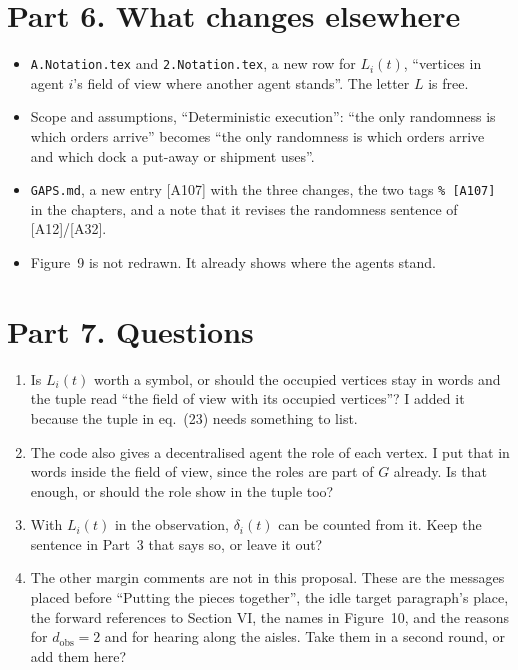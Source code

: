 \documentclass[11pt,a4paper]{article}
\newcommand{\dobs}{d_{\mathrm{obs}}}
\begin{document}
\section*{Part 6. What changes elsewhere}
\begin{itemize}[nosep]
  \item \texttt{A.Notation.tex} and \texttt{2.Notation.tex}, a new row for
        $L_i(t)$, ``vertices in agent $i$'s field of view where another agent
        stands''. The letter $L$ is free.
  \item Scope and assumptions, ``Deterministic execution'': ``the only
        randomness is which orders arrive'' becomes ``the only randomness is
        which orders arrive and which dock a put-away or shipment uses''.
  \item \texttt{GAPS.md}, a new entry [A107] with the three changes, the two
        tags \texttt{\% [A107]} in the chapters, and a note that it revises
        the randomness sentence of [A12]/[A32].
  \item Figure~9 is not redrawn. It already shows where the agents stand.
\end{itemize}

\section*{Part 7. Questions}
\begin{enumerate}
  \item Is $L_i(t)$ worth a symbol, or should the occupied vertices stay in
        words and the tuple read ``the field of view with its occupied
        vertices''? I added it because the tuple in eq.~(23) needs something to
        list.
  \item The code also gives a decentralised agent the role of each vertex. I
        put that in words inside the field of view, since the roles are
        part of $G$ already. Is that enough, or should the role show in the
        tuple too?
  \item With $L_i(t)$ in the observation, $\delta_i(t)$ can be counted from it.
        Keep the sentence in Part~3 that says so, or leave it out?
  \item The other margin comments are not in this proposal. These are the
        messages placed before ``Putting the pieces together'', the idle
        target paragraph's place, the forward references to Section VI, the
        names in Figure~10, and the reasons for $\dobs=2$ and for hearing
        along the aisles. Take them in a second round, or add them here?
\end{enumerate}
\end{document}

